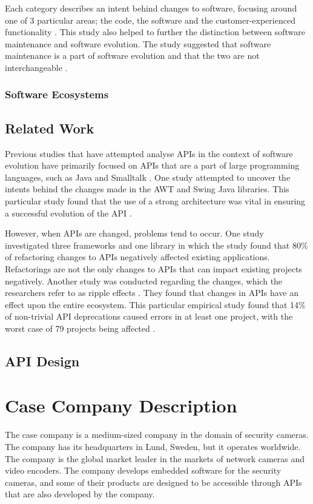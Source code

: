 \documentclass[10pt,twocolumn]{article}
\begin{document}
Each category describes an intent behind changes to software, focusing around one of 3 particular areas; the code, the software and the customer-experienced functionality \cite{chapin2001types}. This study also helped to further the distinction between software maintenance and software evolution. The study suggested that software maintenance is a part of software evolution and that the two are not interchangeable \cite{chapin2001types}.


\subsubsection{Software Ecosystems}



\subsection{Related Work}
Previous studies that have attempted analyse APIs in the context of software evolution have primarily focused on APIs that are a part of large programming languages, such as Java \cite{shi2011empirical} \cite{hou2011exploring} and Smalltalk \cite{robbes2012developers}. One study attempted to uncover the intents behind the changes made in the AWT and Swing Java libraries. This particular study found that the use of a strong architecture was vital in ensuring a successful evolution of the API \cite{hou2011exploring}.

However, when APIs are changed, problems tend to occur. One study \cite{dig2005role} investigated three frameworks and one library in which the study found that 80\% of refactoring changes to APIs negatively affected existing applications. Refactorings are not the only changes to APIs that can impact existing projects negatively. Another study was conducted regarding the changes, which the researchers refer to as ripple effects \cite{robbes2012developers}. They found that changes in APIs have an effect upon the entire ecosystem. This particular empirical study found that 14\% of non-trivial API deprecations caused errors in at least one project, with the worst case of 79 projects being affected \cite{robbes2012developers}.


\subsection{API Design}



\section{Case Company Description}
The case company is a medium-sized company in the domain of security cameras. The company has its headquarters in Lund, Sweden, but it operates worldwide. The company is the global market leader in the markets of network cameras and video encoders. The company develops embedded software for the security cameras, and some of their products are designed to be accessible through APIs that are also developed by the company. 
\end{document}
